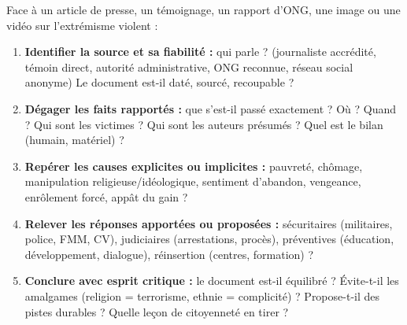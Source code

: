 \documentclass[11pt]{article}
\begin{document}
\begin{methode}
Face à un article de presse, un témoignage, un rapport d'ONG, une image ou une vidéo sur l'extrémisme violent :
\begin{enumerate}
\item \textbf{Identifier la source et sa fiabilité :} qui parle ? (journaliste accrédité, témoin direct, autorité administrative, ONG reconnue, réseau social anonyme) Le document est-il daté, sourcé, recoupable ?
\item \textbf{Dégager les faits rapportés :} que s'est-il passé exactement ? Où ? Quand ? Qui sont les victimes ? Qui sont les auteurs présumés ? Quel est le bilan (humain, matériel) ?
\item \textbf{Repérer les causes explicites ou implicites :} pauvreté, chômage, manipulation religieuse/idéologique, sentiment d'abandon, vengeance, enrôlement forcé, appât du gain ?
\item \textbf{Relever les réponses apportées ou proposées :} sécuritaires (militaires, police, FMM, CV), judiciaires (arrestations, procès), préventives (éducation, développement, dialogue), réinsertion (centres, formation) ?
\item \textbf{Conclure avec esprit critique :} le document est-il équilibré ? Évite-t-il les amalgames (religion = terrorisme, ethnie = complicité) ? Propose-t-il des pistes durables ? Quelle leçon de citoyenneté en tirer ?
\end{enumerate}
\end{methode}
\end{document}
